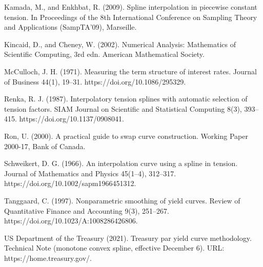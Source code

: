 \begin{thebibliography}{}
 Kamada, M., and Enkhbat, R. (2009). Spline interpolation in piecewise
constant tension. In Proceedings of the 8th International Conference on Sampling Theory
and Applications (SampTA'09), Marseille.

 Kincaid, D., and Cheney, W. (2002). Numerical Analysis: Mathematics
of Scientific Computing, 3rd edn. American Mathematical Society.

 McCulloch, J. H. (1971). Measuring the term structure of interest
rates. Journal of Business 44(1), 19--31. https://doi.org/10.1086/295329.

 Renka, R. J. (1987). Interpolatory tension splines with automatic
selection of tension factors. SIAM Journal on Scientific and Statistical Computing
8(3), 393--415. https://doi.org/10.1137/0908041.

 Ron, U. (2000). A practical guide to swap curve construction. Working
Paper 2000-17, Bank of Canada.

 Schweikert, D. G. (1966). An interpolation curve using a spline in
tension. Journal of Mathematics and Physics 45(1--4), 312--317.
https://doi.org/10.1002/sapm1966451312.

 Tanggaard, C. (1997). Nonparametric smoothing of yield curves.
Review of Quantitative Finance and Accounting 9(3), 251--267.
https://doi.org/10.1023/A:1008286426806.

 US Department of the Treasury (2021). Treasury par yield curve
methodology. Technical Note (monotone convex spline, effective December 6).
URL: https://home.treasury.gov/.

\end{thebibliography}
